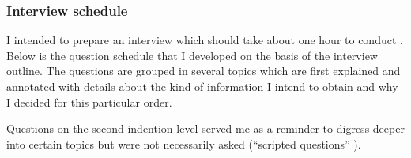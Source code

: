 \subsubsection{Interview schedule}

I intended to prepare an interview which should take about one hour to conduct \cite[p. 82-83]{berg01}. Below is the question schedule that I developed on the basis of the interview outline. The questions are grouped in several topics which are first explained and annotated with details about the kind of information I intend to obtain and why I decided for this particular order.

Questions on the second indention level served me as a reminder to digress deeper into certain topics but were not necessarily asked (\enquote{scripted questions} \cite[p. 92]{berg01}).

